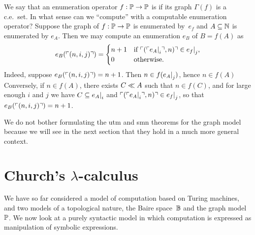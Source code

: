 We say that an enumeration operator $f : \mathbb{P} \to \mathbb{P}$ is
 if its graph $\Gamma(f)$ is a c.e.~set. In what
sense can we ``compute'' with a computable enumeration operator?
Suppose the graph of $f : \mathbb{P} \to \mathbb{P}$ is enumerated by~$e_f$
and $A \subseteq \mathbb{N}$ is enumerated by $e_A$. Then we may compute an
enumeration $e_B$ of $B = f(A)$ as
%
\begin{equation*}
  e_B(\ulcorner (n, i, j) \urcorner) =
  \begin{cases}
    n + 1 & \text{if $\ulcorner (\ulcorner e_A{\mid}_{i} \urcorner, n) \urcorner \in
      e_f{\mid}_{j}$,}\\
    0 & \text{otherwise}.
  \end{cases}
\end{equation*}
%
Indeed, suppose $e_B(\ulcorner (n,i,j) \urcorner) = n + 1$. Then $n \in
f(e_A{\mid}_{j})$, hence $n \in f(A)$ Conversely, if $n \in
f(A)$, there exists $C \ll A$ such that $n \in f(C)$, and for large
enough $i$ and $j$ we have $C \subseteq e_A{\mid}_{i}$ and
$\ulcorner (\ulcorner e_A{\mid}_{i} \urcorner, n) \urcorner \in e_f{\mid}_{j}$, so
that $e_B(\ulcorner (n, i, j) \urcorner) = n + 1$.

We do not bother formulating the utm and smn theorems for the graph
model because we will see in the next section that they hold in a much
more general context.

\section[\texorpdfstring%
{Church's $\lambda$-calculus}%
{Church's lambda-calculus}%
]{Church's $\lambda$-calculus}
\label{sec:lambda-calculus}

We have so far considered a model of computation based on Turing
machines, and two models of a topological nature, the Baire
space~$\mathbb{B}$ and the graph model~$\mathbb{P}$. We now look at a purely
syntactic model in which computation is expressed as manipulation of
symbolic expressions.

